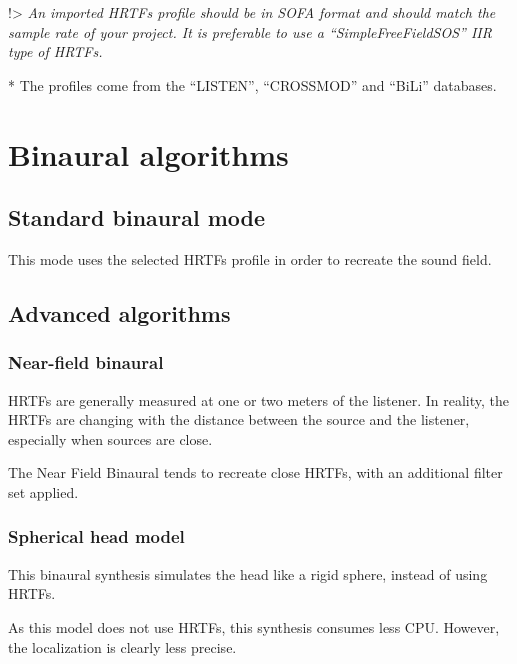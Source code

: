 \documentclass[
  letterpaper,
  DIV=11,
  numbers=noendperiod]{scrreport}
\begin{document}
!\textgreater{} \emph{An imported HRTFs profile should be in SOFA format
and should match the sample rate of your project. It is preferable to
use a ``SimpleFreeFieldSOS'' IIR type of HRTFs.}

* The profiles come from the ``LISTEN'', ``CROSSMOD'' and ``BiLi''
databases.

\hypertarget{binaural-algorithms}{%
\section{Binaural algorithms}\label{binaural-algorithms}}

\hypertarget{standard-binaural-mode}{%
\subsection{Standard binaural mode}\label{standard-binaural-mode}}

This mode uses the selected HRTFs profile in order to recreate the sound
field.

\hypertarget{advanced-algorithms}{%
\subsection{Advanced algorithms}\label{advanced-algorithms}}

\hypertarget{near-field-binaural}{%
\subsubsection{Near-field binaural}\label{near-field-binaural}}

HRTFs are generally measured at one or two meters of the listener. In
reality, the HRTFs are changing with the distance between the source and
the listener, especially when sources are close.

The Near Field Binaural tends to recreate close HRTFs, with an
additional filter set applied.

\hypertarget{spherical-head-model}{%
\subsubsection{Spherical head model}\label{spherical-head-model}}

This binaural synthesis simulates the head like a rigid sphere, instead
of using HRTFs.

As this model does not use HRTFs, this synthesis consumes less CPU.
However, the localization is clearly less precise.
\end{document}
